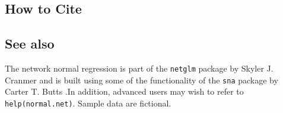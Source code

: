  \subsection* {How to Cite} 



\subsection* {See also}
The network normal regression is part of the {\tt netglm} package by Skyler J. Cranmer and is built using some of the functionality of the  {\tt sna} package by Carter T. Butts \citep{ButCar01}.In addition, advanced users may wish to refer to {\tt help(normal.net)}. Sample data are fictional. 
